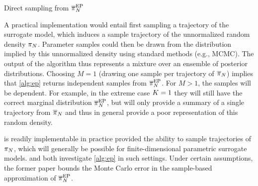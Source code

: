 \documentclass[12pt]{article}
\begin{document}
\begin{algorithm}
    \caption{Direct sampling from $\llikEmSampDensNorm$}
    \label{alg:ep}
    \begin{algorithmic}[1] %
        		\State $\llikEmRdm[\Ndesign]{\postDensNorm}^{(\sampleIndex)} \sim \law(\llikEmRdm[\Ndesign]{\postDensNorm})$ 
		\State $\Par^{(\sampleIndex, 1)}, \dots, \Par^{(\sampleIndex, M)} \overset{iid}{\sim} \llikEmRdm[\Ndesign]{\postDensNorm}^{(\sampleIndex)}}$ \Comment{Sample parameters}
	\EndFor
	\State \Return $\{\Par^{(\sampleIndex, m)}\}_{1 \leq \sampleIndex \leq \NSample, \ 1 \leq m \leq M}$
	\EndFunction
    \end{algorithmic}
\end{algorithm}

A practical implementation 
would entail first sampling a trajectory of the surrogate model, which induces a sample 
trajectory of the unnormalized random density $\llikEmRdmDens[\Ndesign]$. Parameter samples
could then be drawn from the distribution implied by this unnormalized density using standard 
methods (e.g., MCMC).
The output of the algorithm thus represents a mixture over an 
ensemble of posterior distributions. Choosing $M = 1$  (drawing one sample per
trajectory of $\postNormEm[\Ndesign]$) implies that \cref{alg:ep} returns independent 
samples from $\postApproxEP[\Ndesign]$. For $M > 1$, the samples will be dependent.
For example, in the extreme case $\NSample = 1$ they will 
still have the correct marginal distribution $\postApproxEP[\Ndesign]$, but will 
only provide a summary of a single trajectory from $\postNormEm[\Ndesign]$ and thus 
in general provide a poor representation of this random density.

 is readily implementable in practice provided the ability to sample trajectories 
of $\postEm[\Ndesign]$, which will generally be possible for finite-dimensional 
parametric surrogate models. \citet{garegnani2021NoisyMCMC} and \citet{BurknerSurrogate}
both investigate \cref{alg:ep} in such settings. Under certain assumptions, the former paper 
bounds the Monte Carlo error in the sample-based approximation of $\postApproxEP[\Ndesign]$.
\end{document}
